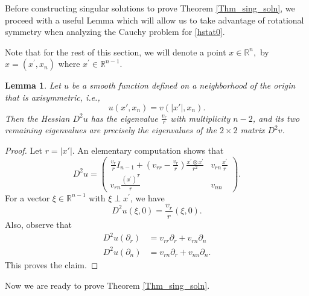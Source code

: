 \documentclass[12pt,reqno]{amsart}%
\theoremstyle{plain}
\newtheorem{lemma}[theorem]{Lemma}
\numberwithin{equation}{section}
\theoremstyle{definition}
\theoremstyle{remark}
\newcommand{\R}{\mathbb{R}}
\begin{document}
Before constructing singular solutions to prove Theorem \ref{Thm_sing_soln},  we proceed with a useful Lemma which will allow us to take advantage of rotational symmetry when analyzing the Cauchy problem for \eqref{hstat0}. 



Note that for the rest of this section, we will denote a point $x \in \R^n,$ by $x = (x^\prime, x_n)$ where $x^\prime \in \R^{n-1}$. 


\begin{lemma}\label{Lem_axisymmetric}
Let $u$ be a smooth function defined on a neighborhood of the origin that is axisymmetric, i.e.,
$$ u(x',x_n) = v(|x'|,x_n). $$
Then the Hessian $D^2 u$ has the eigenvalue $\frac{v_r}{r}$ with multiplicity $n-2$, and its two remaining eigenvalues are precisely the eigenvalues of the $2 \times 2$ matrix $D^2 v$.
\end{lemma}


\begin{proof} Let $r = |x'|$. An elementary computation shows that
$$ D^2 u = \begin{pmatrix} 
\frac{v_r}{r} I_{n-1} + ( v_{rr} - \frac {v_r } r ) \frac{ x^\prime \otimes x^\prime }{r^2} & v_{rn} \frac{x^\prime}{r}\\
v_{rn} \frac{ (x^\prime )^T}{r} & v_{nn}
\end{pmatrix} .$$
For a vector $\xi \in \R^{n-1}$ with $\xi \perp x^\prime$,  we have
$$ D^2 u ( \xi,0 ) = \frac{v_r}{r} (\xi,0).$$
Also, observe that
\begin{align*} D^2 u ( \partial_r )& = v_{rr} \partial_r + v_{rn} \partial_n
\\ D^2 u ( \partial_n ) &= v_{rn} \partial_r + v_{nn} \partial_n.
\end{align*} 
This proves the claim. 
\end{proof} 


Now we are ready to prove Theorem \ref{Thm_sing_soln}.
\end{document}
